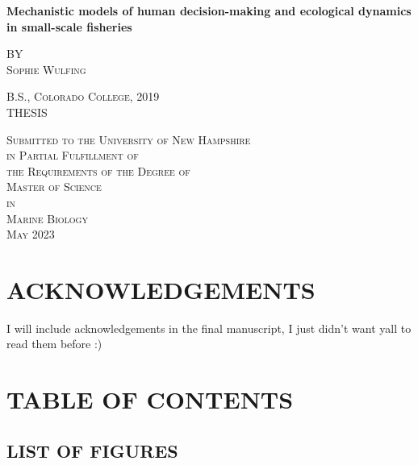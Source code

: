 \documentclass[
]{article}
\author{}
\date{\vspace{-2.5em}}
\begin{document}

\begin{center}
    
\textbf{\Large Mechanistic models of human decision-making and ecological dynamics in small-scale fisheries}
    
\textsc{BY \\ Sophie Wulfing}
\vspace{3 mm}

\textsc{B.S., Colorado College, 2019 \\ }
\vspace{3 mm}
\textsc{THESIS}

\vspace{3 mm}
\textsc{Submitted to the University of New Hampshire \\ in Partial Fulfillment of \\ the Requirements of the Degree of \\ Master of Science \\ in \\ Marine Biology \\ May 2023}

\end{center}

\newpage


\hypertarget{acknowledgements}{%
\section{ACKNOWLEDGEMENTS}\label{acknowledgements}}

I will include acknowledgements in the final manuscript, I just didn't want yall to read them before :)

\newpage

\hypertarget{table-of-contents}{%
\section{TABLE OF CONTENTS}\label{table-of-contents}}

\vspace{-1cm}
\tableofcontents

\newpage

\hypertarget{list-of-figures}{%
\subsection{LIST OF FIGURES}\label{list-of-figures}}
\end{document}
